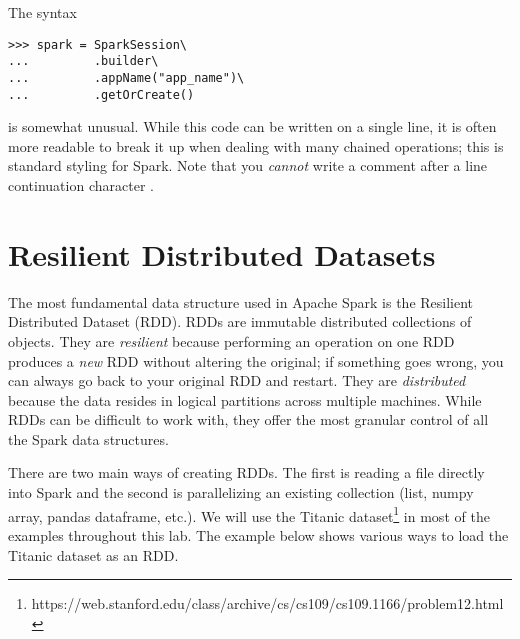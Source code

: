\begin{info}
The syntax
\begin{lstlisting}
>>> spark = SparkSession\
...			.builder\
...			.appName("app_name")\
...			.getOrCreate()
\end{lstlisting}
is somewhat unusual. 
While this code can be written on a single line, it is often more readable to break it up when dealing with many chained operations; this is standard styling for Spark. 
Note that you \textit{cannot} write a comment after a line continuation character .
\end{info}


\section*{Resilient Distributed Datasets} %
The most fundamental data structure used in Apache Spark is the Resilient Distributed Dataset (RDD).
RDDs are immutable distributed collections of objects.
They are \textit{resilient} because performing an operation on one RDD produces a \textit{new} RDD without altering the original; if something goes wrong, you can always go back to your original RDD and restart.
They are \textit{distributed} because the data resides in logical partitions across multiple machines.
While RDDs can be difficult to work with, they offer the most granular control of all the Spark data structures.

There are two main ways of creating RDDs. 
The first is reading a file directly into Spark and the second is parallelizing an existing collection (list, numpy array, pandas dataframe, etc.). 
We will use the Titanic dataset\footnote{https://web.stanford.edu/class/archive/cs/cs109/cs109.1166/problem12.html} in most of the examples throughout this lab.  
The example below shows various ways to load the Titanic dataset as an RDD.

